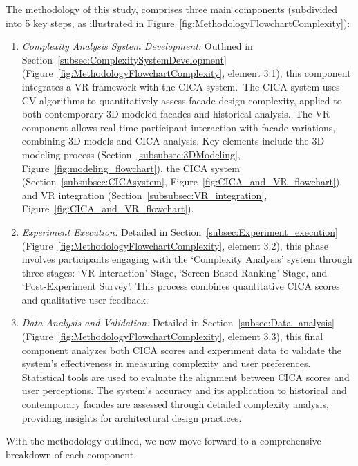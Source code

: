 

The methodology of this study, comprises three main components (subdivided into 5 key steps, as illustrated in  Figure~\ref{fig:MethodologyFlowchartComplexity}):

\begin{enumerate}
    \item \textit{Complexity Analysis System Development:} Outlined in Section~\ref{subsec:ComplexitySystemDevelopment} (Figure~\ref{fig:MethodologyFlowchartComplexity}, element 3.1), this component integrates a VR framework with the CICA system.~The CICA system uses CV algorithms to quantitatively assess facade design complexity, applied to both contemporary 3D-modeled facades and historical analysis.~The VR component allows real-time participant interaction with facade variations, combining 3D models and CICA analysis. Key elements include the 3D modeling process (Section~\ref{subsubsec:3DModeling}, Figure~\ref{fig:modeling_flowchart}), the CICA system (Section~\ref{subsubsec:CICAsystem}, Figure~\ref{fig:CICA_and_VR_flowchart}), and VR integration (Section~\ref{subsubsec:VR_integration}, Figure~\ref{fig:CICA_and_VR_flowchart}).

    \item \textit{Experiment Execution:} Detailed in Section~\ref{subsec:Experiment_execution} (Figure~\ref{fig:MethodologyFlowchartComplexity}, element 3.2), this phase involves participants engaging with the `Complexity Analysis' system through three stages: `VR Interaction' Stage, `Screen-Based Ranking' Stage, and `Post-Experiment Survey'. This process combines quantitative CICA scores and qualitative user feedback.

    \item \textit{Data Analysis and Validation:} Detailed in Section~\ref{subsec:Data_analysis} (Figure~\ref{fig:MethodologyFlowchartComplexity}, element 3.3), this final component analyzes both CICA scores and experiment data to validate the system’s effectiveness in measuring complexity and user preferences. Statistical tools are used to evaluate the alignment between CICA scores and user perceptions. The system's accuracy and its application to historical and contemporary facades are assessed through detailed complexity analysis, providing insights for architectural design practices.
\end{enumerate}

With the methodology outlined, we now move forward to a comprehensive breakdown of each component.


